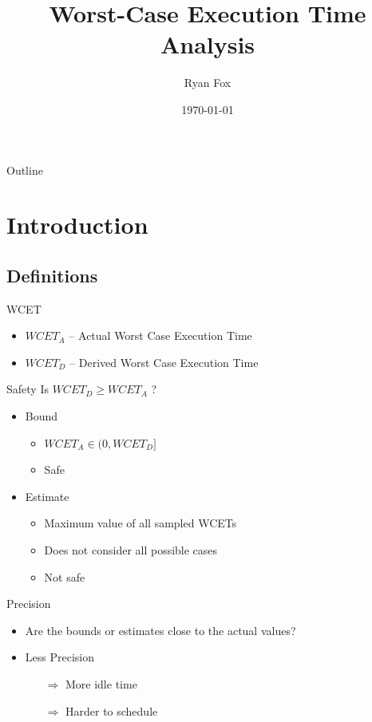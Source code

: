 \documentclass{beamer}
\title{Worst-Case Execution Time Analysis}
\author{Ryan Fox}
\institute
{
  Department of Electrical and Computer Engineering\\
  University of Waterloo
}
\date{\today}
\begin{document}
\begin{frame}
  \titlepage
\end{frame}

\begin{frame}{Outline}
  \tableofcontents[pausesections]
\end{frame}

\section{Introduction}
\subsection{Definitions}

\begin{frame}{WCET}
  \begin{itemize}
    \item $WCET_A$ -- Actual Worst Case Execution Time
    \item $WCET_D$ -- Derived Worst Case Execution Time
  \end{itemize}
\end{frame}

\begin{frame}{Safety}
  Is $WCET_D \geq WCET_A$ ?
  \begin{itemize}
    \item Bound
      \begin{itemize}
        \item $WCET_A \in (0, WCET_D]$
        \item Safe
      \end{itemize}      
      \pause
    \item Estimate
      \begin{itemize}
        \item Maximum value of all sampled WCETs
        \item Does not consider all possible cases
        \item Not safe          
      \end{itemize}      
  \end{itemize}
\end{frame}

\begin{frame}{Precision}
  \begin{itemize}
    \item Are the bounds or estimates close to the actual values? \\
      \pause
    \item Less Precision
      \begin{itemize}
      \item[$\Rightarrow$] More idle time
        \pause
      \item[$\Rightarrow$] Harder to schedule
      \end{itemize}
  \end{itemize}
\end{frame}
\end{document}
